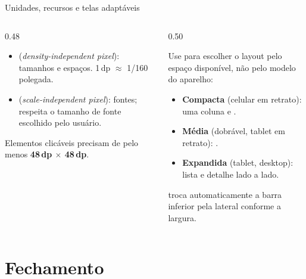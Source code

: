 \documentclass[aspectratio=169,10pt]{beamer}
\begin{document}
\begin{frame}{Unidades, recursos e telas adaptáveis}
  \begin{columns}[T]
    \begin{column}{0.48\textwidth}
      \begin{conceito}
        \begin{itemize}
          \item {} (\emph{density-independent pixel}): tamanhos e espaços. 1\,dp $\approx$ 1/160 polegada.
          \item {} (\emph{scale-independent pixel}): fontes; respeita o tamanho de fonte escolhido pelo usuário.
        \end{itemize}
      \end{conceito}
      \begin{atencao}
        Elementos clicáveis precisam de pelo menos \textbf{48\,dp $\times$ 48\,dp}.
      \end{atencao}
    \end{column}
    \begin{column}{0.50\textwidth}
      \begin{conceito}
        Use  para escolher o layout pelo espaço disponível, não pelo modelo do aparelho:
        \begin{itemize}
          \item \textbf{Compacta} (celular em retrato): uma coluna e .
          \item \textbf{Média} (dobrável, tablet em retrato): .
          \item \textbf{Expandida} (tablet, desktop): lista e detalhe lado a lado.
        \end{itemize}
      \end{conceito}
      \begin{dica}
         troca automaticamente a barra inferior pela lateral conforme a largura.
      \end{dica}
    \end{column}
  \end{columns}
\end{frame}

\section{Fechamento}
\end{document}
